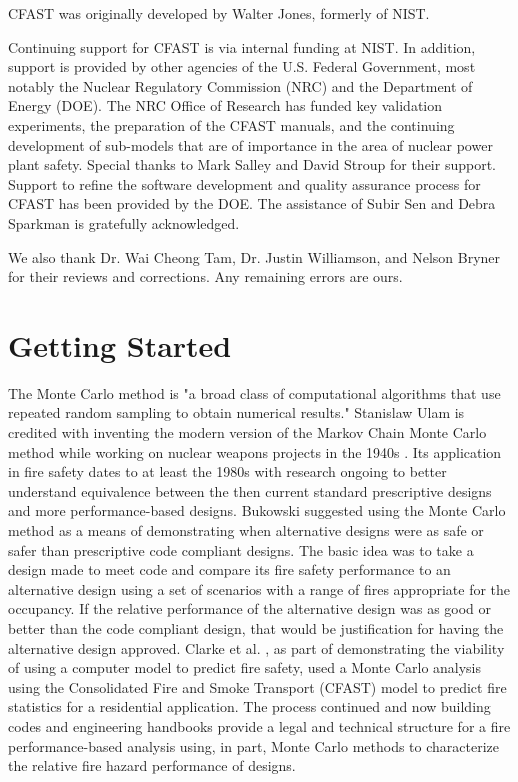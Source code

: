 \documentclass[12pt,twoside]{book}
\begin{document}
\label{acksection}

CFAST was originally developed by Walter Jones, formerly of NIST.

Continuing support for CFAST is via internal funding at NIST. In addition, support is provided by other agencies of the U.S. Federal Government, most notably the Nuclear Regulatory Commission (NRC) and the Department of Energy (DOE). The NRC Office of Research has funded key validation experiments, the preparation of the CFAST manuals, and the continuing development of sub-models that are of importance in the area of nuclear power plant safety. Special thanks to Mark Salley and David Stroup for their support. Support to refine the software development and quality assurance process for CFAST has been provided by the DOE. The assistance of Subir Sen and Debra Sparkman is gratefully acknowledged.

We also thank Dr. Wai Cheong Tam, Dr. Justin Williamson, and Nelson Bryner for their reviews and corrections. Any remaining errors are ours.

\cleardoublepage
\tableofcontents

\clearpage
\listoffigures

\listoftables


\mainmatter

%
%

\chapter{Getting Started}

The Monte Carlo method is "a broad class of computational algorithms that use repeated random sampling to obtain numerical results." \cite{wikipedia_montecarlo} Stanislaw Ulam is credited with inventing the modern version of the Markov Chain Monte Carlo method while working on nuclear weapons projects in the 1940s \cite{Metropolis:1987}. Its application in fire safety dates to at least the 1980s with research ongoing to better understand equivalence between the then current standard prescriptive designs and more performance-based designs. Bukowski \cite{Bukowski_1985} suggested using the Monte Carlo method as a means of demonstrating when alternative designs were as safe or safer than prescriptive code compliant designs. The basic idea was to take a design made to meet code and compare its fire safety performance to an alternative design using a set of scenarios with a range of fires appropriate for the occupancy. If the relative performance of the alternative design was as good or better than the code compliant design, that would be justification for having the alternative design approved. Clarke et al. \cite{Clarke_1990}, as part of demonstrating the viability of using a computer model to predict fire safety, used a Monte Carlo analysis using the Consolidated Fire and Smoke Transport (CFAST) model to predict fire statistics for a residential application. The process continued and now building codes \cite{NFPA_5000} and engineering handbooks \cite{Hurley_2016} provide a legal and technical structure for a fire performance-based analysis using, in part, Monte Carlo methods to characterize the relative fire hazard performance of designs.
\end{document}
